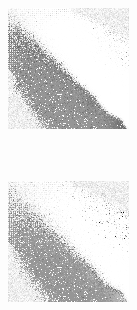 
\begin{figure}
\center

	\begin{subfigure}[t]{0.22\textwidth}
		\center
		\includegraphics[width=\textwidth]{images/findings/experiments/regularization/strats/0.70/hand_max_min.png}
		\caption{\handmaxmin}
	\end{subfigure}
	~
	\begin{subfigure}[t]{0.22\textwidth}
		\center
		\includegraphics[width=\textwidth]{images/findings/experiments/regularization/strats/0.70/hand_max_avg.png}

\end{subfigure}
\end{figure}
